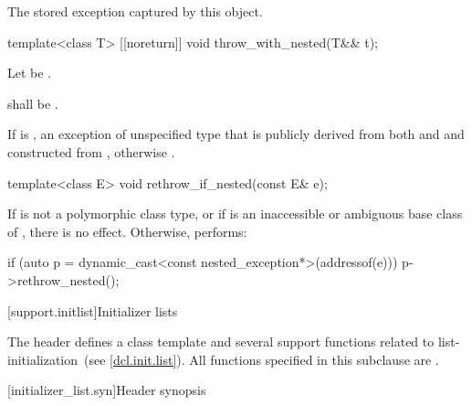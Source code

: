 \begin{itemdescr}
\pnum
\returns The stored exception captured by this  object.
\end{itemdescr}

%
\begin{itemdecl}
template<class T> [[noreturn]] void throw_with_nested(T&& t);
\end{itemdecl}

\begin{itemdescr}
\pnum
Let  be .

\pnum
\requires {} shall be .

\pnum
\throws
If 
is ,
an exception of unspecified type that is publicly derived from both
 and 
and constructed from , otherwise
.
\end{itemdescr}

%
\begin{itemdecl}
template<class E> void rethrow_if_nested(const E& e);
\end{itemdecl}

\begin{itemdescr}
\pnum
\effects
If  is not a polymorphic class type, or
if  is an inaccessible or ambiguous base class of ,
there is no effect.
Otherwise, performs:
\begin{codeblock}
if (auto p = dynamic_cast<const nested_exception*>(addressof(e)))
  p->rethrow_nested();
\end{codeblock}
\end{itemdescr}

[support.initlist]{Initializer lists}

%
\pnum
The header  defines a class template and several
support functions related to list-initialization~(see \ref{dcl.init.list}).
%
All functions specified in this subclause are .

[initializer_list.syn]{Header  synopsis}
%
%
%

